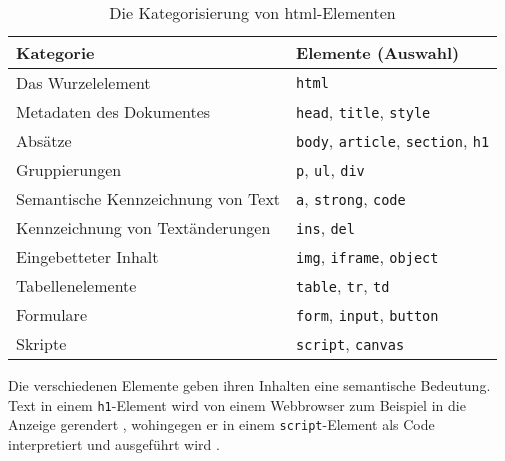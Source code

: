             \begin{table}[h]
                \centering
                \begin{tabular}{|l|l|}
                \hline
                \textbf{Kategorie} & \textbf{Elemente (Auswahl)} \\
                \hline
                Das Wurzelelement & \texttt{html} \\
                \hline
                Metadaten des Dokumentes & \texttt{head}, \texttt{title}, \texttt{style} \\
                \hline
                Absätze & \texttt{body}, \texttt{article}, \texttt{section}, \texttt{h1} \\
                \hline
                Gruppierungen & \texttt{p}, \texttt{ul}, \texttt{div} \\
                \hline
                Semantische Kennzeichnung von Text & \texttt{a}, \texttt{strong}, \texttt{code} \\
                \hline
                Kennzeichnung von Textänderungen & \texttt{ins}, \texttt{del} \\
                \hline
                Eingebetteter Inhalt & \texttt{img}, \texttt{iframe}, \texttt{object} \\
                \hline
                Tabellenelemente & \texttt{table}, \texttt{tr}, \texttt{td} \\
                \hline
                Formulare & \texttt{form}, \texttt{input}, \texttt{button} \\
                \hline
                Skripte & \texttt{script}, \texttt{canvas} \\
                \hline
                \end{tabular}
                \caption{Die Kategorisierung von \acrshort{html}-Elementen}
                \label{table:htmlElements}
            \end{table}

            Die verschiedenen Elemente geben ihren Inhalten eine semantische Bedeutung.
            Text in einem \texttt{h1}-Element wird von einem Webbrowser zum Beispiel in die Anzeige gerendert
            \cite[Kapitel 4.3.6]{w3c:html5},
            wohingegen er in einem \texttt{script}-Element als Code interpretiert und ausgeführt wird
            \cite[Kapitel 4.11.1]{w3c:html5}.
        
